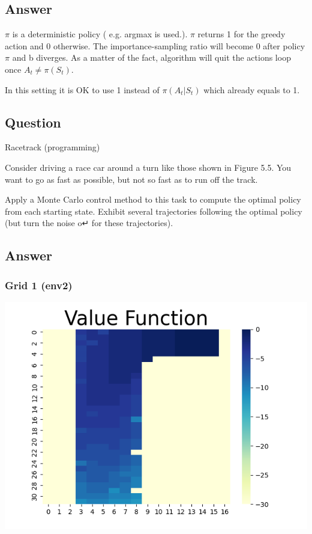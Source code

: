 \documentclass[11pt]{article}
\begin{document}
    \subsection*{Answer}

    $\pi$ is a deterministic policy ( e.g. argmax is used.).
    $ \pi $ returns 1 for the greedy action and 0 otherwise.
    The importance-sampling ratio will become 0 after policy $\pi$ and b diverges.
    As a matter of the fact, algorithm will quit the actions loop once $ A_t \neq \pi(S_t)$.

    In this setting it is OK to use 1 instead of $\pi(A_t|S_t)$ which already equals to 1.

    \subsection{Question}

    Racetrack (programming)

    Consider driving a race car around a turn like those shown in Figure 5.5. You want to go as fast as possible, but not so fast as to run off the track.

    Apply a Monte Carlo control method to this task to compute the optimal policy from each starting state.
    Exhibit several trajectories following the optimal policy (but turn the noise o↵ for these trajectories).

    \subsection*{Answer}

    \subsubsection*{Grid 1 (env2)}

    \includegraphics[scale=0.7]{env2_5_3_1_max}
\end{document}
